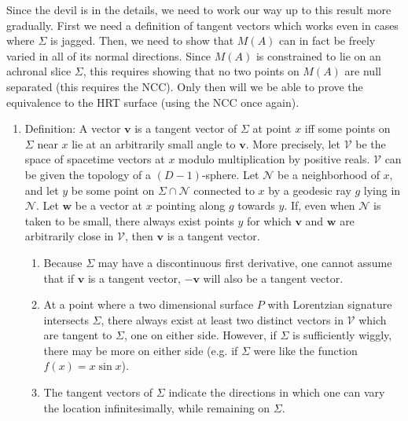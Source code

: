 \documentclass[12pt]{article}
\begin{document}
Since the devil is in the details, we need to work our way up to this result more gradually.  First we need a definition of tangent vectors which works even in cases where $\Sigma$ is jagged.  Then, we need to show that $M(A)$ can in fact be freely varied in all of its normal directions.  Since $M(A)$ is constrained to lie on an achronal slice $\Sigma$, this requires showing that no two points on $M(A)$ are null separated (this requires the NCC).  Only then will we be able to prove the equivalence to the HRT surface (using the NCC once again).

\begin{enumerate}[resume]
\item Definition: A vector $\mathbf{v}$ is a tangent vector of $\Sigma$ at point $x$ iff some points on $\Sigma$ near $x$ lie at an arbitrarily small angle to $\mathbf{v}$.  More precisely, let $\mathcal{V}$ be the space of spacetime vectors at $x$ modulo multiplication by positive reals.  $\mathcal{V}$ can be given the topology of a $(D-1)$-sphere.  Let $\mathcal{N}$ be a neighborhood of $x$, and let $y$ be some point on $\Sigma \cap \mathcal{N}$ connected to $x$ by a geodesic ray $g$ lying in $\mathcal{N}$.  Let $\mathbf{w}$ be a vector at $x$ pointing along $g$ towards $y$.  If, even when $\mathcal{N}$ is taken to be small, there always exist points $y$ for which $\mathbf{v}$ and $\mathbf{w}$ are arbitrarily close in $\mathcal{V}$, then $\mathbf{v}$ is a tangent vector.
	\begin{enumerate}
	\item Because $\Sigma$ may have a discontinuous first derivative, one cannot assume that if $\mathbf{v}$ is a tangent vector, $-\mathbf{v}$ will also be a tangent vector.
	\item At a point where a two dimensional surface $P$ with Lorentzian signature intersects $\Sigma$, there always exist at least two distinct vectors in $\mathcal{V}$ which are tangent to $\Sigma$, one on either side.  However, if $\Sigma$ is sufficiently wiggly, there may be more on either side (e.g. if $\Sigma$ were like the function $f(x) = x \sin x$).
	\item The tangent vectors of $\Sigma$ indicate the directions in which one can vary the location infinitesimally, while remaining on $\Sigma$.
	\end{enumerate}


\end{enumerate}
\end{document}
